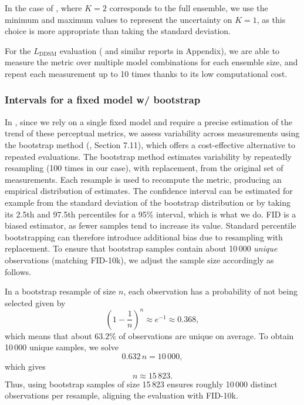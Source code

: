 \documentclass[10pt]{article} %
\newcommand{\DDSM}{\text{DDSM}}
\begin{document}
In the case of , where $K=2$ corresponds to the full ensemble, we use the minimum and maximum values to represent the uncertainty on $K=1$, as this choice is more appropriate than taking the standard deviation.

For the $L_\DDSM$ evaluation ( and similar reports in Appendix), we are able to measure the metric over multiple model combinations for each ensemble size, and repeat each measurement up to 10 times thanks to its low computational cost.

\subsubsection{Intervals for a fixed model w/ bootstrap}

In , since we rely on a single fixed model and require a precise estimation of the trend of these perceptual metrics, we assess variability across measurements using the bootstrap method (\citealp{hastie2009elements}, Section 7.11), which offers a cost-effective alternative to repeated evaluations. The bootstrap method estimates variability by repeatedly resampling (100 times in our case), with replacement, from the original set of measurements. Each resample is used to recompute the metric, producing an empirical distribution of estimates. The confidence interval can be estimated for example from the standard deviation of the bootstrap distribution or by taking its 2.5th and 97.5th percentiles for a 95\% interval, which is what we do.
FID is a biased estimator, as fewer samples tend to increase its value. Standard percentile bootstrapping can therefore introduce additional bias due to resampling with replacement. To ensure that bootstrap samples contain about 10\,000 \emph{unique} observations (matching FID-10k), we adjust the sample size accordingly as follows.

In a bootstrap resample of size $n$, each observation has a probability of not being selected given by
\begin{equation}
\left(1 - \frac{1}{n}\right)^n \approx e^{-1} \approx 0.368,
\end{equation}
which means that about $63.2\%$ of observations are unique on average. To obtain 10\,000 unique samples, we solve
\begin{equation}
0.632 \, n = 10\,000,
\end{equation}
which gives
\begin{equation}
n \approx 15\,823.
\end{equation}
Thus, using bootstrap samples of size 15\,823 ensures roughly 10\,000 distinct observations per resample, aligning the evaluation with FID-10k.
\end{document}
